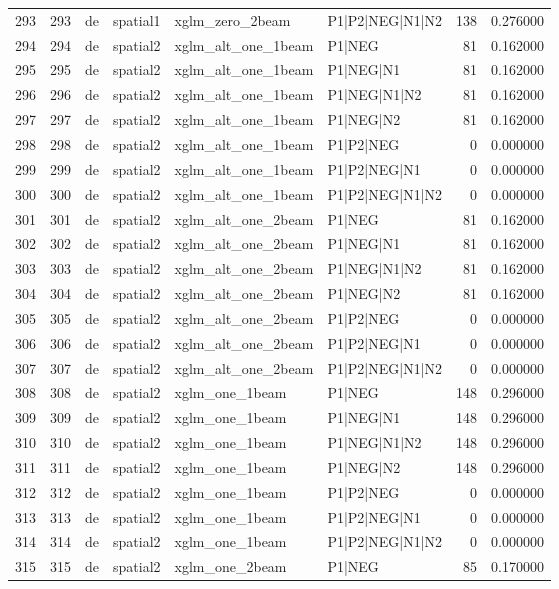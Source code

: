 \begin{tabular}{lrllllrr}
293 & 293 & de & spatial1 & xglm_zero_2beam & P1|P2|NEG|N1|N2 & 138 & 0.276000 \\
294 & 294 & de & spatial2 & xglm_alt_one_1beam & P1|NEG & 81 & 0.162000 \\
295 & 295 & de & spatial2 & xglm_alt_one_1beam & P1|NEG|N1 & 81 & 0.162000 \\
296 & 296 & de & spatial2 & xglm_alt_one_1beam & P1|NEG|N1|N2 & 81 & 0.162000 \\
297 & 297 & de & spatial2 & xglm_alt_one_1beam & P1|NEG|N2 & 81 & 0.162000 \\
298 & 298 & de & spatial2 & xglm_alt_one_1beam & P1|P2|NEG & 0 & 0.000000 \\
299 & 299 & de & spatial2 & xglm_alt_one_1beam & P1|P2|NEG|N1 & 0 & 0.000000 \\
300 & 300 & de & spatial2 & xglm_alt_one_1beam & P1|P2|NEG|N1|N2 & 0 & 0.000000 \\
301 & 301 & de & spatial2 & xglm_alt_one_2beam & P1|NEG & 81 & 0.162000 \\
302 & 302 & de & spatial2 & xglm_alt_one_2beam & P1|NEG|N1 & 81 & 0.162000 \\
303 & 303 & de & spatial2 & xglm_alt_one_2beam & P1|NEG|N1|N2 & 81 & 0.162000 \\
304 & 304 & de & spatial2 & xglm_alt_one_2beam & P1|NEG|N2 & 81 & 0.162000 \\
305 & 305 & de & spatial2 & xglm_alt_one_2beam & P1|P2|NEG & 0 & 0.000000 \\
306 & 306 & de & spatial2 & xglm_alt_one_2beam & P1|P2|NEG|N1 & 0 & 0.000000 \\
307 & 307 & de & spatial2 & xglm_alt_one_2beam & P1|P2|NEG|N1|N2 & 0 & 0.000000 \\
308 & 308 & de & spatial2 & xglm_one_1beam & P1|NEG & 148 & 0.296000 \\
309 & 309 & de & spatial2 & xglm_one_1beam & P1|NEG|N1 & 148 & 0.296000 \\
310 & 310 & de & spatial2 & xglm_one_1beam & P1|NEG|N1|N2 & 148 & 0.296000 \\
311 & 311 & de & spatial2 & xglm_one_1beam & P1|NEG|N2 & 148 & 0.296000 \\
312 & 312 & de & spatial2 & xglm_one_1beam & P1|P2|NEG & 0 & 0.000000 \\
313 & 313 & de & spatial2 & xglm_one_1beam & P1|P2|NEG|N1 & 0 & 0.000000 \\
314 & 314 & de & spatial2 & xglm_one_1beam & P1|P2|NEG|N1|N2 & 0 & 0.000000 \\
315 & 315 & de & spatial2 & xglm_one_2beam & P1|NEG & 85 & 0.170000 \\

\end{tabular}
